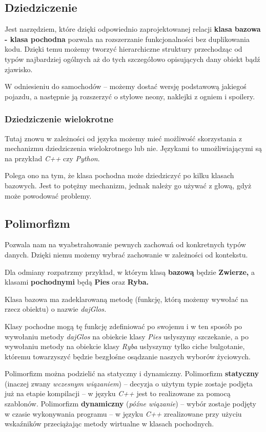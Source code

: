 \subsection{Dziedziczenie}
Jest narzędziem, które dzięki odpowiednio zaprojektowanej relacji \textbf{klasa bazowa - klasa pochodna} pozwala na rozszerzanie funkcjonalności bez duplikowania kodu. Dzięki temu możemy tworzyć hierarchiczne struktury przechodząc od typów najbardziej ogólnych aż do tych szczegółowo opisujących dany obiekt bądź zjawisko.

W odniesieniu do samochodów -- możemy dostać wersję podstawową jakiegoś pojazdu, a następnie ją rozszerzyć o stylowe neony, naklejki z ogniem i spoilery.

\subsubsection{Dziedziczenie wielokrotne}
Tutaj znowu w zależności od języka możemy mieć możliwość skorzystania z mechanizmu dziedziczenia wielokrotnego lub nie. Językami to umożliwiającymi są na przykład \textit{C++} czy \textit{Python}. 

Polega ono na tym, że klasa pochodna może dziedziczyć po kilku klasach bazowych.
Jest to potężny mechanizm, jednak należy go używać z głową, gdyż może powodować problemy.

\subsection{Polimorfizm}
Pozwala nam na wyabstrahowanie pewnych zachowań od konkretnych typów danych. Dzięki niemu możemy wybrać zachowanie w zależności od kontekstu.

Dla odmiany rozpatrzmy przykład, w którym klasą \textbf{bazową} będzie \textbf{Zwierze,} a klasami \textbf{pochodnymi} będą \textbf{Pies} oraz \textbf{Ryba.}

Klasa bazowa ma zadeklarowaną metodę (funkcję, którą możemy wywołać na rzecz obiektu) o nazwie \textit{dajGlos.}

Klasy pochodne mogą tę funkcję zdefiniować po swojemu i w ten sposób po wywołaniu metody \textit{dajGlos} na obiekcie klasy \textit{Pies} usłyszymy szczekanie, a po wywołaniu metody na obiekcie klasy \textit{Ryba} usłyszymy tylko ciche bulgotanie, któremu towarzyszyć będzie bezgłośne osądzanie naszych wyborów życiowych.

Polimorfizm można podzielić na statyczny i dynamiczny. Polimorfizm \textbf{statyczny} (inaczej zwany \textit{wczesnym wiązaniem}) -- decyzja o użytym typie zostaje podjęta już na etapie kompilacji -- w języku \textit{C++} jest to realizowane za pomocą szablonów.  Polimorfizm \textbf{dynamiczny} (\textit{późne wiązanie}) -- wybór zostaje podjęty w czasie wykonywania programu -- w języku \textit{C++} zrealizowane przy użyciu wskaźników przeciążając metody wirtualne w klasach pochodnych.

